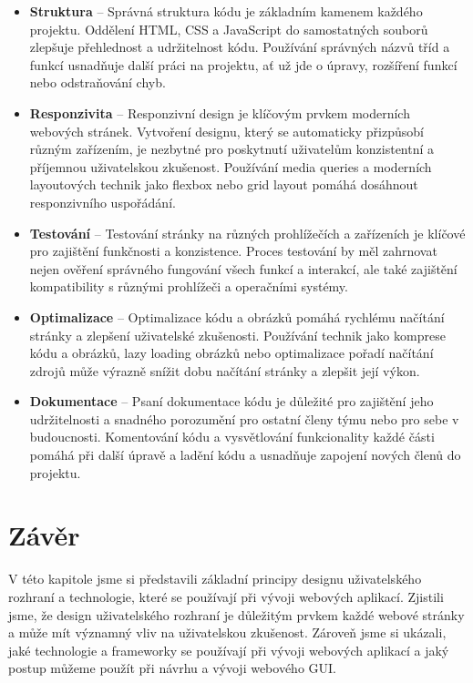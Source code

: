 \begin{itemize}
  \item \textbf{Struktura} -- Správná struktura kódu je základním kamenem každého projektu. Oddělení HTML, CSS a JavaScript do samostatných souborů zlepšuje přehlednost a udržitelnost kódu. Používání správných názvů tříd a funkcí usnadňuje další práci na projektu, ať už jde o úpravy, rozšíření funkcí nebo odstraňování chyb.
  \item \textbf{Responzivita} -- Responzivní design je klíčovým prvkem moderních webových stránek. Vytvoření designu, který se automaticky přizpůsobí různým zařízením, je nezbytné pro poskytnutí uživatelům konzistentní a příjemnou uživatelskou zkušenost. Používání media queries a moderních layoutových technik jako flexbox nebo grid layout pomáhá dosáhnout responzivního uspořádání.
  \item \textbf{Testování} -- Testování stránky na různých prohlížečích a zařízeních je klíčové pro zajištění funkčnosti a konzistence. Proces testování by měl zahrnovat nejen ověření správného fungování všech funkcí a interakcí, ale také zajištění kompatibility s různými prohlížeči a operačními systémy.
  \item \textbf{Optimalizace} -- Optimalizace kódu a obrázků pomáhá rychlému načítání stránky a zlepšení uživatelské zkušenosti. Používání technik jako komprese kódu a obrázků, lazy loading obrázků nebo optimalizace pořadí načítání zdrojů může výrazně snížit dobu načítání stránky a zlepšit její výkon.
  \item \textbf{Dokumentace} --  Psaní dokumentace kódu je důležité pro zajištění jeho udržitelnosti a snadného porozumění pro ostatní členy týmu nebo pro sebe v budoucnosti. Komentování kódu a vysvětlování funkcionality každé části pomáhá při další úpravě a ladění kódu a usnadňuje zapojení nových členů do projektu.
\end{itemize}

\section{Závěr}
\label{sec:conclusion}

V této kapitole jsme si představili základní principy designu uživatelského rozhraní a technologie, které se používají při vývoji webových aplikací. Zjistili jsme, že design uživatelského rozhraní je důležitým prvkem každé webové stránky a může mít významný vliv na uživatelskou zkušenost. Zároveň jsme si ukázali, jaké technologie a frameworky se používají při vývoji webových aplikací a jaký postup můžeme použít při návrhu a vývoji webového GUI.